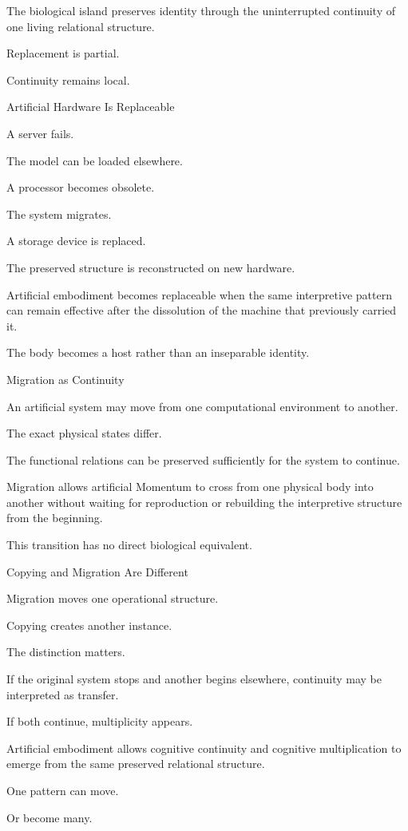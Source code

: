 The biological island preserves identity through the uninterrupted continuity of one living relational structure.

Replacement is partial.

Continuity remains local.

Artificial Hardware Is Replaceable

A server fails.

The model can be loaded elsewhere.

A processor becomes obsolete.

The system migrates.

A storage device is replaced.

The preserved structure is reconstructed on new hardware.

Artificial embodiment becomes replaceable when the same interpretive pattern can remain effective after the dissolution of the machine that previously carried it.

The body becomes a host rather than an inseparable identity.

Migration as Continuity

An artificial system may move from one computational environment to another.

The exact physical states differ.

The functional relations can be preserved sufficiently for the system to continue.

Migration allows artificial Momentum to cross from one physical body into another without waiting for reproduction or rebuilding the interpretive structure from the beginning.

This transition has no direct biological equivalent.

Copying and Migration Are Different

Migration moves one operational structure.

Copying creates another instance.

The distinction matters.

If the original system stops and another begins elsewhere, continuity may be interpreted as transfer.

If both continue, multiplicity appears.

Artificial embodiment allows cognitive continuity and cognitive multiplication to emerge from the same preserved relational structure.

One pattern can move.

Or become many.


